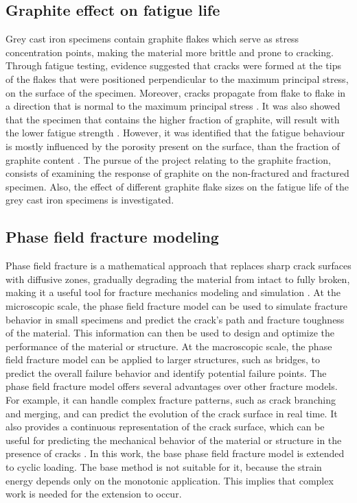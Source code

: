 \documentclass[11pt,a4paper]{article}
\begin{document}
\subsection{Graphite effect on fatigue life}
Grey cast iron specimens contain graphite flakes which serve as stress concentration points, making the material more brittle and prone to cracking. Through fatigue testing, evidence suggested that cracks were formed at the tips of the flakes that were positioned perpendicular to the maximum principal stress, on the surface of the specimen. Moreover, cracks propagate from flake to flake in a direction that is normal to the maximum principal stress \cite{WEINACHT198779}. It was also showed that the specimen that contains the higher fraction of graphite, will result with the lower fatigue strength \cite{yilagaqi2023effect}. However, it was identified that the fatigue behaviour is mostly influenced by the porosity present on the surface, than the fraction of graphite content \cite{borsato2016mechanical}. The pursue of the project relating to the graphite fraction, consists of examining the response of graphite on the non-fractured and fractured specimen. Also, the effect of different graphite flake sizes on the fatigue life of the grey cast iron specimens is investigated.
\subsection{Phase field fracture modeling}
Phase field fracture is a mathematical approach that replaces sharp crack surfaces with diffusive zones, gradually degrading the material from intact to fully broken, making it a useful tool for fracture mechanics modeling and simulation \cite{miehe2010phase}. At the microscopic scale, the phase field fracture model can be used to simulate fracture behavior in small specimens and predict the crack's path and fracture toughness of the material. This information can then be used to design and optimize the performance of the material or structure. At the macroscopic scale, the phase field fracture model can be applied to larger structures, such as bridges, to predict the overall failure behavior and identify potential failure points. The phase field fracture model offers several advantages over other fracture models. For example, it can handle complex fracture patterns, such as crack branching and merging, and can predict the evolution of the crack surface in real time. It also provides a continuous representation of the crack surface, which can be useful for predicting the mechanical behavior of the material or structure in the presence of cracks \cite{miehe2010phase} \cite{kristensen2016assessment}. In this work, the base phase field fracture model is extended to cyclic loading. The base method is not suitable for it, because the strain energy depends only on the monotonic application. This implies that complex work is needed for the extension to occur.
\end{document}
